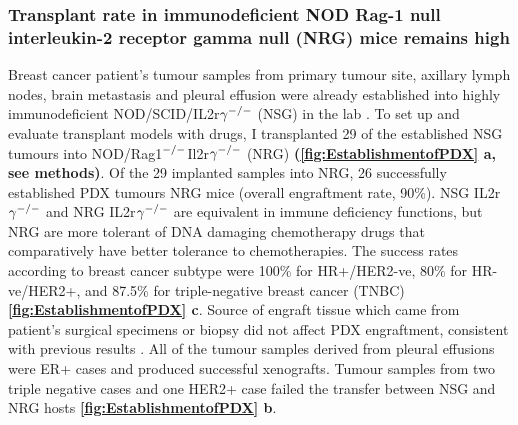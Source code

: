 \subsubsection{Transplant rate in immunodeficient NOD Rag-1 null interleukin-2 receptor gamma null (NRG) mice remains high}

Breast cancer patient's tumour samples from primary tumour site, axillary lymph nodes, brain metastasis and pleural effusion were already established into highly immunodeficient NOD/SCID/IL2r$\gamma^{\small{-/-}}$ (NSG) in the lab \cite{eirew2015dynamics}. 
To set up and evaluate transplant models with drugs, I transplanted 29 of the established NSG tumours into NOD/Rag1$^{\small{-/-}}$Il2r$\gamma ^{\small{-/-}}$ (NRG) \cite{pearson2008non} \textbf{(\autoref{fig:EstablishmentofPDX} a, see methods)}.
Of the 29 implanted samples into NRG, 26 successfully established PDX tumours NRG mice (overall engraftment rate, 90\%). NSG IL2r$\gamma^{\small{-/-}}$ and NRG IL2r$\gamma^{\small{-/-}}$ are equivalent in immune deficiency functions, but NRG are more tolerant of DNA damaging chemotherapy drugs that comparatively have better tolerance to chemotherapies. 
The success rates according to breast cancer subtype were 100\% for HR+/HER2-ve, 80\% for HR-ve/HER2+, and 87.5\% for triple-negative breast cancer (TNBC) \textbf{\autoref{fig:EstablishmentofPDX} c}. Source of engraft tissue which came from patient's surgical specimens or biopsy did not affect PDX engraftment, consistent with previous results \cite{ryu2019integrative}. 
All of the tumour samples derived from pleural effusions were ER+ cases and produced successful xenografts. Tumour samples from two triple negative cases and one HER2+ case failed the transfer between NSG and NRG hosts \textbf{\autoref{fig:EstablishmentofPDX} b}.


